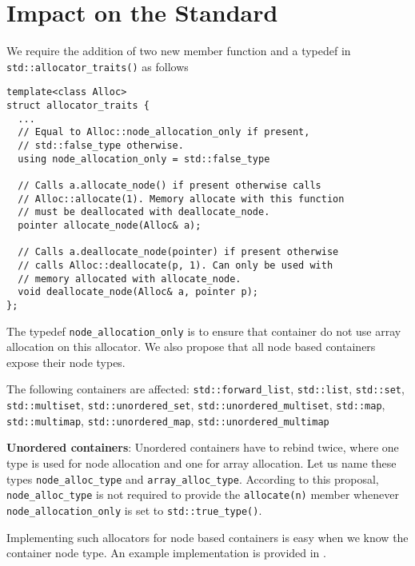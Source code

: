 \documentclass[11pt]{article}
\begin{document}
\section{Impact on the Standard} \label{impact}

We require the addition of two new member function and
a typedef in \texttt{std::allocator\_traits()} as follows

\medskip
\begin{lstlisting}
template<class Alloc>
struct allocator_traits {
  ...
  // Equal to Alloc::node_allocation_only if present,
  // std::false_type otherwise.
  using node_allocation_only = std::false_type

  // Calls a.allocate_node() if present otherwise calls
  // Alloc::allocate(1). Memory allocate with this function
  // must be deallocated with deallocate_node.
  pointer allocate_node(Alloc& a);

  // Calls a.deallocate_node(pointer) if present otherwise
  // calls Alloc::deallocate(p, 1). Can only be used with
  // memory allocated with allocate_node.
  void deallocate_node(Alloc& a, pointer p);
};
\end{lstlisting}

The typedef \texttt{node\_allocation\_only} is to ensure that
container do not use array allocation on this allocator.
We also propose that all node based containers expose their node types.

The following containers are affected: \texttt{std::forward\_list},
\texttt{std::list}, \texttt{std::set}, \texttt{std::multiset},
\texttt{std::unordered\_set}, \texttt{std::unordered\_multiset},
\texttt{std::map}, \texttt{std::multimap},
\texttt{std::unordered\_map}, \texttt{std::unordered\_multimap}

%
\medskip
\noindent
{\bf Unordered containers}: Unordered containers have to rebind twice,
where one type is used for node allocation and one for array allocation.
Let us name these types \texttt{node\_alloc\_type} and \texttt{array\_alloc\_type}.
According to this proposal, \texttt{node\_alloc\_type} is not required to
provide the \texttt{allocate(n)} member whenever \texttt{node\_allocation\_only}
is set to \texttt{std::true\_type()}.

Implementing such allocators for node based containers is easy when we know
the container node type. An example implementation is provided in \cite{rtcpp}.
\end{document}
